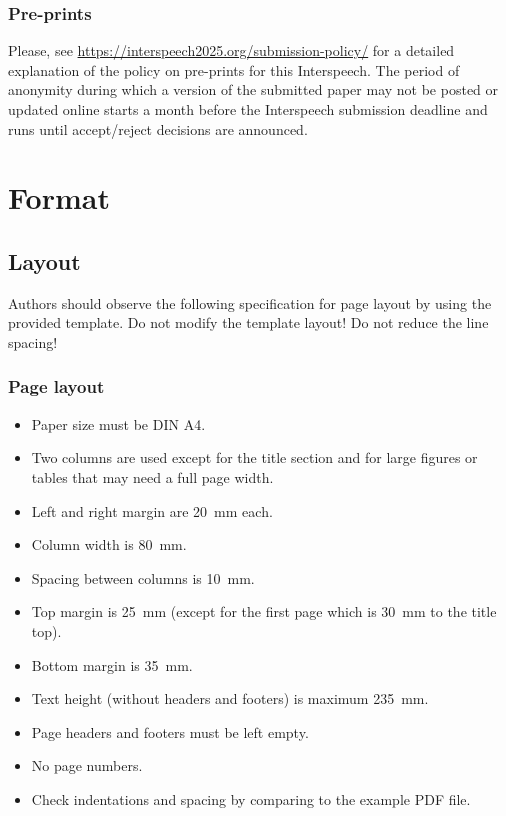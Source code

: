 \documentclass{Interspeech}
\begin{document}
\subsubsection{Pre-prints}
\label{section:preprints}

Please, see \url{https://interspeech2025.org/submission-policy/} for a detailed explanation of the policy on pre-prints for this Interspeech. The period of anonymity during which a version of the submitted paper may not be posted or updated online starts a month before the Interspeech submission deadline and runs until accept/reject decisions are announced.

\section{Format}

\subsection{Layout}

Authors should observe the following specification for page layout by using the provided template. Do not modify the template layout! Do not reduce the line spacing!

\subsubsection{Page layout}

\begin{itemize}
\item Paper size must be DIN A4.
\item Two columns are used except for the title section and for large figures or tables that may need a full page width.
\item Left and right margin are \SI{20}{\milli\metre} each. 
\item Column width is \SI{80}{\milli\metre}. 
\item Spacing between columns is \SI{10}{\milli\metre}.
\item Top margin is \SI{25}{\milli\metre} (except for the first page which is \SI{30}{\milli\metre} to the title top).
\item Bottom margin is \SI{35}{\milli\metre}.
\item Text height (without headers and footers) is maximum \SI{235}{\milli\metre}.
\item Page headers and footers must be left empty.
\item No page numbers.
\item Check indentations and spacing by comparing to the example PDF file.
\end{itemize}
\end{document}
